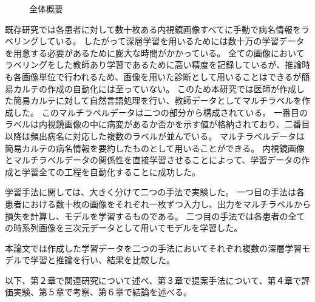 \begin{figure}[htbp]
    \centering
         \quad
         \quad
    \captionsetup{format=plain,font=normalsize,margin=30pt,name=図}
    \caption[]{全体概要}
    \label{fig:overview}
\end{figure}

既存研究では各患者に対して数十枚ある内視鏡画像すべてに手動で病名情報をラベリングしている。
したがって深層学習を用いるためには数十万の学習データを用意する必要があるために膨大な時間がかかっている。
全ての画像においてラベリングをした教師あり学習であるために高い精度を記録しているが、推論時も各画像単位で行われるため、画像を用いた診断として用いることはできるが簡易カルテの作成の自動化には至っていない。
このため本研究では医師が作成した簡易カルテに対して自然言語処理を行い、教師データとしてマルチラベルを作成した。
このマルチラベルデータは二つの部分から構成されている。
一番目のラベルは内視鏡画像の中に病変があるか否かを示す値が格納されており、二番目以降は頻出病名に対応した複数のラベルが並んでいる。
マルチラベルデータは簡易カルテの病名情報を要約したものとして用いることができる。
内視鏡画像とマルチラベルデータの関係性を直接学習させることによって、学習データの作成と学習全ての工程を自動化することに成功した。

学習手法に関しては、大きく分けて二つの手法で実験した。
一つ目の手法は各患者における数十枚の画像をそれぞれ一枚ずつ入力し、出力をマルチラベルから損失を計算し、モデルを学習するものである。
二つ目の手法では各患者の全ての時系列画像を三次元データとして用いてモデルを学習した。

本論文では作成した学習データを二つの手法においてそれぞれ複数の深層学習モデルで学習と推論を行い、結果を比較した。

以下、第２章で関連研究について述べ、第３章で提案手法について、第４章で評価実験、第５章で考察、第６章で結論を述べる。
